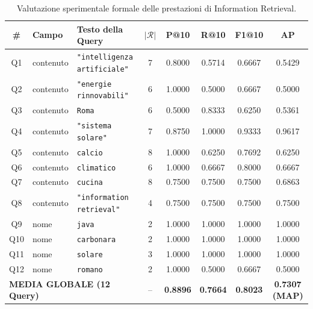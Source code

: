 \documentclass[11pt,a4paper]{article}
\begin{document}
\begin{table}[htbp]
\centering
\small
\begin{tabular}{cllccccc}
\toprule
\textbf{\#} & \textbf{Campo} & \textbf{Testo della Query} & \textbf{$|\mathcal{R}|$} & \textbf{P@10} & \textbf{R@10} & \textbf{F1@10} & \textbf{AP} \\
\midrule
Q1  & contenuto & \texttt{"intelligenza artificiale"} & 7  & 0.8000 & 0.5714 & 0.6667 & 0.5429 \\
Q2  & contenuto & \texttt{"energie rinnovabili"}      & 6  & 1.0000 & 0.5000 & 0.6667 & 0.5000 \\
Q3  & contenuto & \texttt{Roma}                       & 6  & 0.5000 & 0.8333 & 0.6250 & 0.5361 \\
Q4  & contenuto & \texttt{"sistema solare"}           & 7  & 0.8750 & 1.0000 & 0.9333 & 0.9617 \\
Q5  & contenuto & \texttt{calcio}                     & 8  & 1.0000 & 0.6250 & 0.7692 & 0.6250 \\
Q6  & contenuto & \texttt{climatico}                  & 6  & 1.0000 & 0.6667 & 0.8000 & 0.6667 \\
Q7  & contenuto & \texttt{cucina}                     & 8  & 0.7500 & 0.7500 & 0.7500 & 0.6863 \\
Q8  & contenuto & \texttt{"information retrieval"}    & 4  & 0.7500 & 0.7500 & 0.7500 & 0.7500 \\
Q9  & nome      & \texttt{java}                       & 2  & 1.0000 & 1.0000 & 1.0000 & 1.0000 \\
Q10 & nome      & \texttt{carbonara}                  & 2  & 1.0000 & 1.0000 & 1.0000 & 1.0000 \\
Q11 & nome      & \texttt{solare}                     & 3  & 1.0000 & 1.0000 & 1.0000 & 1.0000 \\
Q12 & nome      & \texttt{romano}                     & 2  & 1.0000 & 0.5000 & 0.6667 & 0.5000 \\
\midrule
\multicolumn{3}{l}{\textbf{MEDIA GLOBALE (12 Query)}} & -- & \textbf{0.8896} & \textbf{0.7664} & \textbf{0.8023} & \textbf{0.7307 (MAP)} \\
\bottomrule
\end{tabular}
\caption{Valutazione sperimentale formale delle prestazioni di Information Retrieval.}
\label{tab:ir_metrics}
\end{table}
\end{document}
